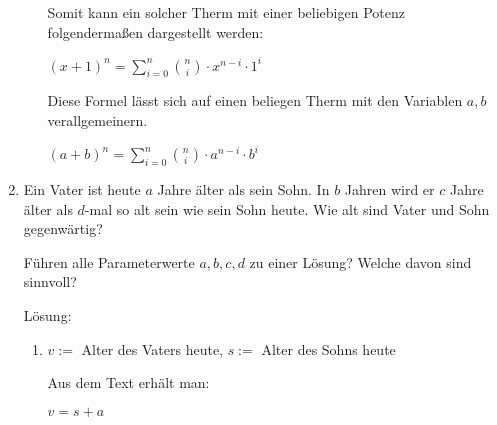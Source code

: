 \documentclass[../main.tex]{subfiles}
\begin{document}
\begin{enumerate}
\begin{enumerate}
		            Somit kann ein solcher Therm mit einer beliebigen Potenz folgendermaßen dargestellt werden:

		            \begin{math}
			            (x + 1)^n = \sum_{i = 0}^{n} \binom{n}{i} \cdot x^{n-i} \cdot 1^i
		            \end{math}

		            Diese Formel lässt sich auf einen beliegen Therm mit den Variablen \begin{math}
			            a, b
		            \end{math} verallgemeinern.

		            \begin{math}
			            (a + b)^n = \sum_{i = 0}^{n} \binom{n}{i} \cdot a^{n-i} \cdot b^i
		            \end{math}
	      \end{enumerate}
	\item Ein Vater ist heute \begin{math}
		      a
	      \end{math} Jahre älter als sein Sohn.
	      In \begin{math}
		      b
	      \end{math} Jahren wird er \begin{math}
		      c
	      \end{math} Jahre älter als \begin{math}
		      d
	      \end{math}-mal so alt sein wie sein Sohn heute.
	      Wie alt sind Vater und Sohn gegenwärtig?

	      Führen alle Parameterwerte \begin{math}
		      a, b, c, d
	      \end{math} zu einer Lösung?
	      Welche davon sind sinnvoll?

	      Lösung:
	      \begin{enumerate}
		      \item
		            \begin{math}
			            v :=
		            \end{math} Alter des Vaters heute,
		            \begin{math}
			            s :=
		            \end{math} Alter des Sohns heute

		            Aus dem Text erhält man:

		            \begin{math}
			            v = s + a
		            \end{math}


\end{enumerate}
\end{enumerate}
\end{document}
